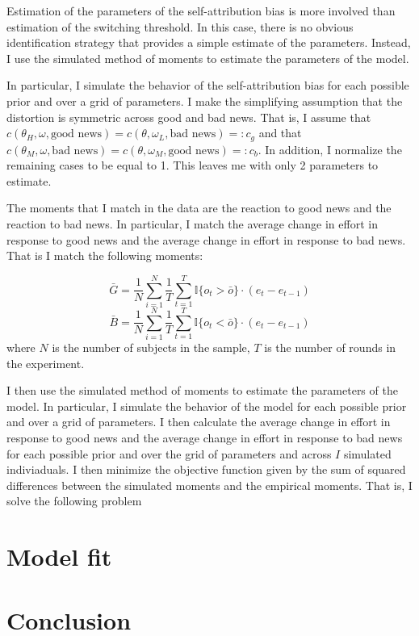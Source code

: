 \documentclass[
  12pt,
]{article}
\begin{document}
Estimation of the parameters of the self-attribution bias is more
involved than estimation of the switching threshold. In this case, there
is no obvious identification strategy that provides a simple estimate of
the parameters. Instead, I use the simulated method of moments to
estimate the parameters of the model.

In particular, I simulate the behavior of the self-attribution bias for
each possible prior and over a grid of parameters. I make the
simplifying assumption that the distortion is symmetric across good and
bad news. That is, I assume that
\(c(\theta_H, \omega, \text{good news})=c(\theta, \omega_L, \text{bad news})=:c_g\)
and that
\(c(\theta_M, \omega, \text{bad news})=c(\theta, \omega_M, \text{good news})=:c_b\).
In addition, I normalize the remaining cases to be equal to 1. This
leaves me with only 2 parameters to estimate.

The moments that I match in the data are the reaction to good news and
the reaction to bad news. In particular, I match the average change in
effort in response to good news and the average change in effort in
response to bad news. That is I match the following moments:

\[
\bar{G} = \frac{1}{N}\sum_{i=1}^N \frac{1}{T}\sum_{t=1}^T \mathbb{I}\{o_t > \bar{o}\} \cdot (e_t - e_{t-1}) 
\] \[
\bar{B} = \frac{1}{N}\sum_{i=1}^N \frac{1}{T}\sum_{t=1}^T \mathbb{I}\{o_t < \bar{o}\} \cdot (e_t - e_{t-1})
\] where \(N\) is the number of subjects in the sample, \(T\) is the
number of rounds in the experiment.

I then use the simulated method of moments to estimate the parameters of
the model. In particular, I simulate the behavior of the model for each
possible prior and over a grid of parameters. I then calculate the
average change in effort in response to good news and the average change
in effort in response to bad news for each possible prior and over the
grid of parameters and across \(I\) simulated indiviaduals. I then
minimize the objective function given by the sum of squared differences
between the simulated moments and the empirical moments. That is, I
solve the following problem

\hypertarget{model-fit}{%
\section{Model fit}\label{model-fit}}

\hypertarget{conclusion}{%
\section{Conclusion}\label{conclusion}}
\end{document}
